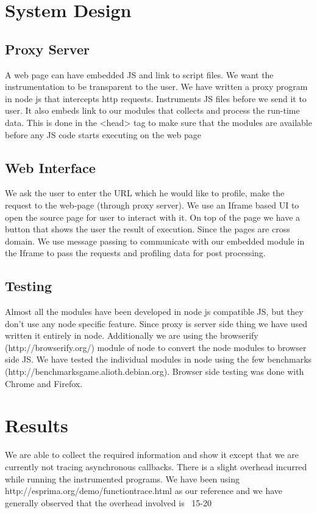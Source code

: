 \documentclass[paper=a4, fontsize=11pt]{scrartcl} %
\numberwithin{equation}{section} %
\numberwithin{figure}{section} %
\numberwithin{table}{section} %
\begin{document}
\section{System Design}
\subsection{Proxy Server}
A web page can have embedded JS and link to script files. We want the instrumentation to be transparent to the user. We have written a proxy program in node js that intercepts http requests. Instruments JS files before we send it to user. It also embeds link to our modules that collects and process the run-time data. This is done in the <head> tag to make sure that the modules are available before any JS code starts executing on the web page

\subsection{Web Interface}
We ask the user to enter the URL which he would like to profile, make the request to the web-page (through proxy server). We use an Iframe based UI to open the source page for user to interact with it. On top of the page we have a button that shows the user the result of execution. Since the pages are cross domain. We use message passing to communicate with our embedded module in the Iframe to pass the requests and profiling data for post processing.

\subsection{Testing}
Almost all the modules have been developed in node js compatible JS, but they don't use any node specific feature. Since proxy is server side thing we have used written it entirely in node. Additionally we are using the browserify (http://browserify.org/) module of node to convert the node modules to browser side JS. We have tested the individual modules in node using the few benchmarks (http://benchmarksgame.alioth.debian.org). Browser side testing was done with Chrome and Firefox.

\section{Results}
We are able to collect the required information and show it except that we are currently not tracing asynchronous callbacks. There is a slight overhead incurred while running the instrumented programs. We have been using http://esprima.org/demo/functiontrace.html as our reference and we have generally observed that the overhead involved is ~15-20%
\end{document}
